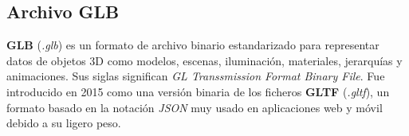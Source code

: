 \subsection{Archivo GLB}
\textbf{GLB} (\textit{.glb}) es un formato de archivo binario estandarizado para representar datos de objetos 3D como modelos, escenas, iluminación, materiales, jerarquías y animaciones. Sus siglas significan \textit{GL Transsmission Format Binary File}. Fue introducido en 2015 como una versión binaria de los ficheros \textbf{GLTF} (\textit{.gltf}), un formato basado en la notación \textit{JSON} muy usado en aplicaciones web y móvil debido a su ligero peso.
